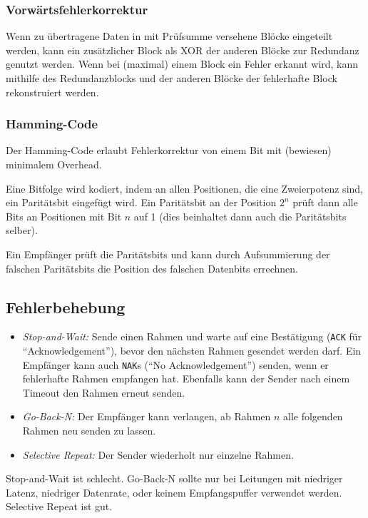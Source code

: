 \documentclass[a4paper,parskip=half*,DIV=15,fontsize=11pt]{scrartcl}
\begin{document}
\subsubsection{Vorwärtsfehlerkorrektur}

Wenn zu übertragene Daten in mit Prüfsumme versehene Blöcke eingeteilt werden, kann ein zusätzlicher Block als XOR der anderen Blöcke zur Redundanz genutzt werden. Wenn bei (maximal) einem Block ein Fehler erkannt wird, kann mithilfe des Redundanzblocks und der anderen Blöcke der fehlerhafte Block rekonstruiert werden.

\subsubsection{Hamming-Code}

Der Hamming-Code erlaubt Fehlerkorrektur von einem Bit mit (bewiesen) minimalem Overhead.

Eine Bitfolge wird kodiert, indem an allen Positionen, die eine Zweierpotenz sind, ein Paritätsbit eingefügt wird. Ein Paritätsbit an der Position $2^n$ prüft dann alle Bits an Positionen mit Bit $n$ auf 1 (dies beinhaltet dann auch die Paritätsbits selber).

Ein Empfänger prüft die Paritätsbits und kann durch Aufsummierung der falschen Paritätsbits die Position des falschen Datenbits errechnen.

\subsection{Fehlerbehebung}

\begin{itemize}
\item \emph{Stop-and-Wait:} Sende einen Rahmen und warte auf eine Bestätigung (\lstinline{ACK} für ``Acknowledgement''), bevor den nächsten Rahmen gesendet werden darf. Ein Empfänger kann auch \lstinline{NAK}s (``No Acknowledgement'') senden, wenn er fehlerhafte Rahmen empfangen hat. Ebenfalls kann der Sender nach einem Timeout den Rahmen erneut senden.
\item \emph{Go-Back-N:} Der Empfänger kann verlangen, ab Rahmen $n$ alle folgenden Rahmen neu senden zu lassen.
\item \emph{Selective Repeat:} Der Sender wiederholt nur einzelne Rahmen.
\end{itemize}

Stop-and-Wait ist schlecht. Go-Back-N sollte nur bei Leitungen mit niedriger Latenz, niedriger Datenrate, oder keinem Empfangspuffer verwendet werden. Selective Repeat ist gut.
\end{document}
